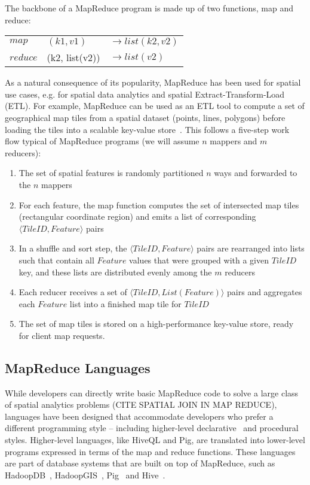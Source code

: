 \documentclass[11pt, oneside]{report}   	%
\begin{document}
The backbone of a MapReduce program is made up of two functions, map and reduce:

\begin{tabular}{l l l}
$map$ & $(k1, v1)$ & $\rightarrow list(k2, v2)$\\ 
$reduce$ & (k2, list(v2)) & $\rightarrow list(v2)$ \\
\end{tabular}

As a natural consequence of its popularity, MapReduce has been used for spatial use cases, e.g. for spatial data analytics and spatial Extract-Transform-Load (ETL). For example, MapReduce can be used as an ETL tool to compute a set of geographical map tiles from a spatial dataset (points, lines, polygons) before loading the tiles into a scalable key-value store~\cite{dean2009lessons}. This follows a five-step work flow typical of MapReduce programs (we will assume $n$ mappers and $m$ reducers):

\begin{enumerate}
\item The set of spatial features is randomly partitioned $n$ ways and forwarded to the $n$ mappers

\item For each feature, the map function computes the set of intersected map tiles (rectangular coordinate region) and emits a list of corresponding $\langle TileID, Feature \rangle$ pairs

\item In a shuffle and sort step, the $\langle TileID, Feature \rangle$ pairs are rearranged into lists such that contain all $Feature$ values that were grouped with a given $TileID$ key, and these lists are distributed evenly among the $m$ reducers

\item Each reducer receives a set of $\langle TileID, List(Feature) \rangle$ pairs and aggregates each $Feature$ list into a finished map tile for $TileID$

\item The set of map tiles is stored on a high-performance key-value store, ready for client map requests. 
\end{enumerate}

\subsection{MapReduce Languages}

While developers can directly write basic MapReduce code to solve a large class of spatial analytics problems (CITE SPATIAL JOIN IN MAP REDUCE), languages have been designed that accommodate developers who prefer a different programming style -- including higher-level declarative~\cite{thusoo2009hive} and procedural~\cite{olston2008pig,eldawy2014pigeon} styles. Higher-level languages, like HiveQL and Pig, are translated into lower-level programs expressed in terms of the map and reduce functions. These languages are part of database systems that are built on top of MapReduce, such as HadoopDB~\cite{abouzeid2009hadoopdb}, HadoopGIS~\cite{aji2013hadoopgis}, Pig~\cite{eldawy2014pigeon, olston2008pig} and Hive~\cite{thusoo2009hive}.
\end{document}
